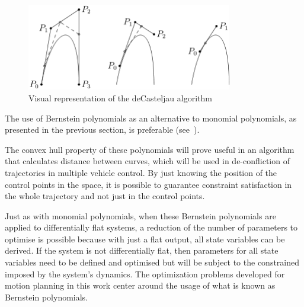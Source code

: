\begin{figure}[h!]
\centering
\includegraphics[width=0.8\textwidth]{Images/deCasteljau.png}
\caption{Visual representation of the deCasteljau algorithm}
\label{fig:deCasteljau}
\end{figure}




\par The use of Bernstein polynomials as an alternative to monomial polynomials, as presented in the previous section, is preferable (see~\cite{cichella2018bernstein}). 

The convex hull property of these polynomials will prove useful in an algorithm that calculates distance between curves, which will be used in de-confliction of trajectories in multiple vehicle control. By just knowing the position of the control points in the space, it is possible to guarantee constraint satisfaction in the whole trajectory and not just in the control points.

\par Just as with monomial polynomials, when these Bernstein polynomials are applied to differentially flat systems, a reduction of the number of parameters to optimise is possible because with just a flat output, all state variables can be derived. If the system is not differentially flat, then parameters for all state variables need to be defined and optimised but will be subject to the constrained imposed by the system's dynamics.
The optimization problems developed for motion planning in this work center around the usage of what is known as Bernstein polynomials.


